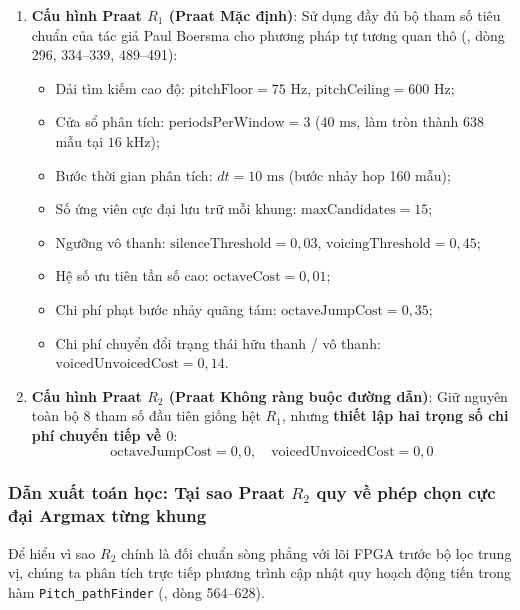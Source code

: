 \begin{enumerate}
    \item \textbf{Cấu hình Praat $R_1$ (Praat Mặc định)}:
    Sử dụng đầy đủ bộ tham số tiêu chuẩn của tác giả Paul Boersma cho phương pháp tự tương quan thô (, dòng 296, 334--339, 489--491):
    \begin{itemize}
        \item Dải tìm kiếm cao độ: $\text{pitchFloor} = 75\text{ Hz}$, $\text{pitchCeiling} = 600\text{ Hz}$;
        \item Cửa sổ phân tích: $\text{periodsPerWindow} = 3$ ($40\text{ ms}$, làm tròn thành 638 mẫu tại $16\text{ kHz}$);
        \item Bước thời gian phân tích: $dt = 10\text{ ms}$ (bước nhảy hop 160 mẫu);
        \item Số ứng viên cực đại lưu trữ mỗi khung: $\text{maxCandidates} = 15$;
        \item Ngưỡng vô thanh: $\text{silenceThreshold} = 0{,}03$, $\text{voicingThreshold} = 0{,}45$;
        \item Hệ số ưu tiên tần số cao: $\text{octaveCost} = 0{,}01$;
        \item Chi phí phạt bước nhảy quãng tám: $\text{octaveJumpCost} = 0{,}35$;
        \item Chi phí chuyển đổi trạng thái hữu thanh / vô thanh: $\text{voicedUnvoicedCost} = 0{,}14$.
    \end{itemize}

    \item \textbf{Cấu hình Praat $R_2$ (Praat Không ràng buộc đường dẫn)}:
    Giữ nguyên toàn bộ 8 tham số đầu tiên giống hệt $R_1$, nhưng \textbf{thiết lập hai trọng số chi phí chuyển tiếp về $0$}:
    \begin{equation}
        \text{octaveJumpCost} = 0{,}0, \quad \text{voicedUnvoicedCost} = 0{,}0
    \end{equation}
\end{enumerate}

\subsubsection*{Dẫn xuất toán học: Tại sao Praat $R_2$ quy về phép chọn cực đại Argmax từng khung}
Để hiểu vì sao $R_2$ chính là đối chuẩn sòng phẳng với lõi FPGA trước bộ lọc trung vị, chúng ta phân tích trực tiếp phương trình cập nhật quy hoạch động tiến trong hàm \texttt{Pitch\_pathFinder} (, dòng 564--628).

